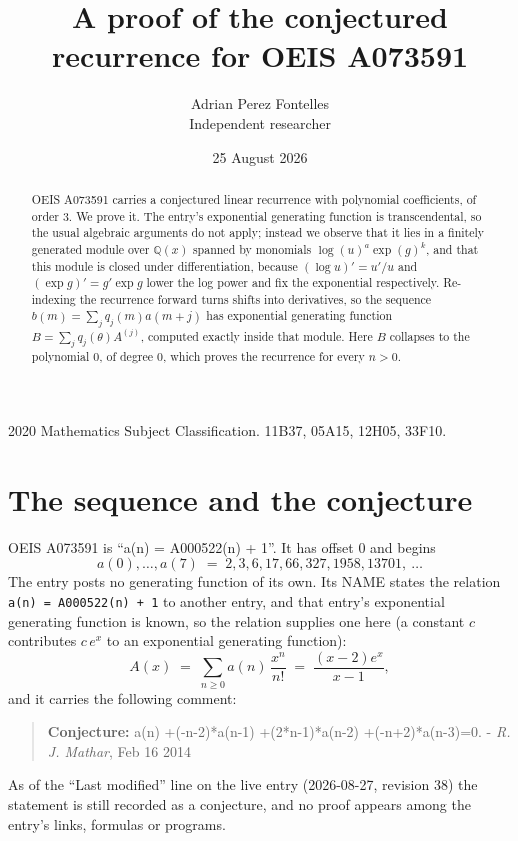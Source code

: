 \documentclass[11pt,a4paper]{article}
\title{A proof of the conjectured recurrence for OEIS A073591}
\author{Adrian Perez Fontelles\\ \small Independent researcher}
\date{25 August 2026}
\theoremstyle{plain}
\theoremstyle{definition}
\begin{document}
\maketitle

\begin{abstract}
OEIS A073591 carries a conjectured linear recurrence with polynomial coefficients, of
order 3. We prove it. The entry's exponential generating function is
transcendental, so the usual algebraic arguments do not apply; instead we observe that it
lies in a finitely generated module over $\mathbb{Q}(x)$ spanned by monomials
$\log(u)^{a}\exp(g)^{k}$, and that this module is closed under differentiation, because
$(\log u)'=u'/u$ and $(\exp g)'=g'\exp g$ lower the log power and fix the exponential
respectively. Re-indexing the recurrence forward turns shifts into derivatives, so the
sequence $b(m)=\sum_{j}q_{j}(m)a(m+j)$ has exponential generating function
$B=\sum_{j}q_{j}(\theta)A^{(j)}$, computed exactly inside that module. Here $B$ collapses
to the polynomial $0$, of degree $0$, which proves the recurrence for every
$n>0$.
\end{abstract}

\noindent\small 2020 Mathematics Subject Classification. 11B37, 05A15, 12H05, 33F10.\normalsize

\section{The sequence and the conjecture}

OEIS A073591 is ``a(n) = A000522(n) + 1''. It has offset $0$ and begins
\[
a(0),\dots,a(7)\;=\;2, 3, 6, 17, 66, 327, 1958, 13701,\ \dots
\]
The entry posts no generating function of its own. Its NAME states the
relation \texttt{a(n) = A000522(n) + 1} to another entry, and that entry's exponential generating
function is known, so the relation supplies one here (a constant $c$ contributes
$c\,e^{x}$ to an exponential generating function):
\begin{equation}\label{eq:gf}
A(x)\;=\;\sum_{n\ge 0} a(n)\,\frac{x^{n}}{n!}\;=\;\frac{\left(x - 2\right) e^{x}}{x - 1} ,
\end{equation}
and it carries the following comment:
\begin{quote}\small
\textbf{Conjecture:} a(n) +(-n-2)*a(n-1) +(2*n-1)*a(n-2) +(-n+2)*a(n-3)=0. - \emph{R. J. Mathar}, Feb 16 2014
\end{quote}
As of the ``Last modified'' line on the live entry (2026-08-27, revision 38) the
statement is still recorded as a conjecture, and no proof appears among the entry's links,
formulas or programs.
\end{document}
